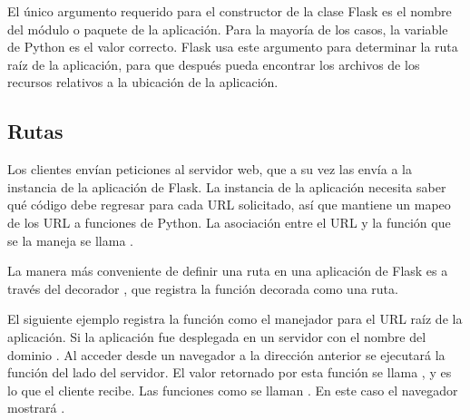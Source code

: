 \begin{sphinxVerbatim}[commandchars=\\\{\}]
   
  
\end{sphinxVerbatim}

El único argumento requerido para el constructor de la clase Flask es el nombre
del módulo o paquete de la aplicación. Para la mayoría de los casos,
la variable de Python  es el valor correcto. Flask usa este argumento
para determinar la ruta raíz de la aplicación, para que después pueda encontrar
los archivos de los recursos relativos a la ubicación de la aplicación.


\subsection*{Rutas}
\label{\detokenize{chapter_two/desc_cloudnao:rutas}}
Los clientes envían peticiones al servidor web, que a su vez las envía a la
instancia de la aplicación de Flask. La instancia de la aplicación necesita saber
qué código debe regresar para cada URL solicitado, así que mantiene un mapeo de
los URL a funciones de Python. La asociación entre el URL y la función que se
la maneja se llama .

La manera más conveniente de definir una ruta en una aplicación de Flask es
a través del decorador , que registra la función decorada como
una ruta.

El siguiente ejemplo registra la función  como el manejador para el URL
raíz de la aplicación. Si la aplicación fue desplegada en un servidor con el
nombre del dominio . Al acceder desde un navegador a
la dirección anterior se ejecutará la función  del lado del servidor.
El valor
retornado por esta función se llama , y es lo que el cliente recibe.
Las funciones como  se llaman .
En este caso el navegador mostrará .

\begin{sphinxVerbatim}[commandchars=\\\{\}]
 
   
\end{sphinxVerbatim}

